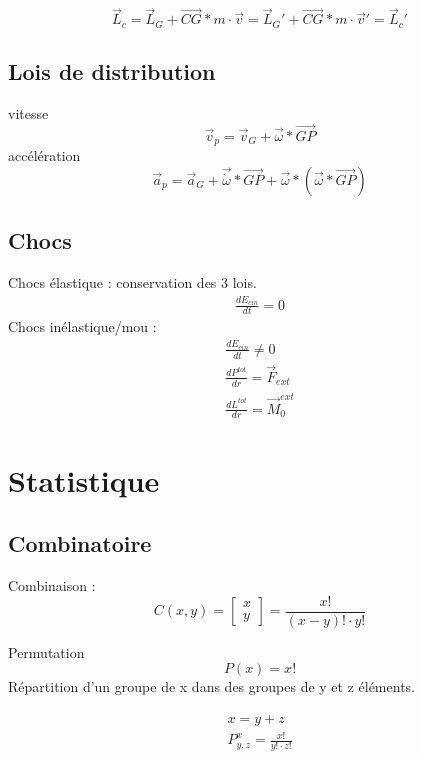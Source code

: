 	\begin{equation}
	\vec{L}_c=\vec{L}_G+ \vec{CG} * m \cdot \vec{v}=\vec{L}_G'+ \vec{CG} * m \cdot \vec{v}'=\vec{L}_c'
	\end{equation}
	
	\subsection{Lois de distribution}
	vitesse
	\begin{equation}
	\vec{v}_p=\vec{v}_G+\vec{\omega}*\vec{GP}
	\end{equation}
	accélération
	\begin{equation}
	\vec{a}_p=\vec{a}_G+\vec{\dot{\omega}}*\vec{GP}+\vec{\omega}*(\vec{\omega}*\vec{GP})
	\end{equation}
	
	\subsection{Chocs}
	Chocs élastique : conservation des 3 lois. 
	\begin{eqnarray}
	\frac{dE_{cin}}{dt} =0
	\end{eqnarray}
	Chocs inélastique/mou :
	\begin{eqnarray}
	\frac{dE_{cin}}{dt} \neq 0\\
	\frac{d P^{tot}}{dr}=\vec{F}_{ext}\\
	\frac{d L^{tot}}{dr}=\vec{M}_{0}^{ext}
	\end{eqnarray}
	
	\newpage
	\section{Statistique}
	\subsection{Combinatoire}
	Combinaison : 
	\begin{equation}
	C(x,y)=\begin{bmatrix}
	x\\
	y
	\end{bmatrix}=\frac{x!}{(x-y)!\cdot y!}
	\end{equation}
	
	
	Permutation
	\begin{equation}
	P(x)=x!
	\end{equation}
	Répartition d'un groupe de x dans des groupes de y et z éléments.
	
	\begin{eqnarray}
	x=y+z\\
	P^x_{y,z}=\frac{x!}{y! \cdot z!}
	\end{eqnarray}
